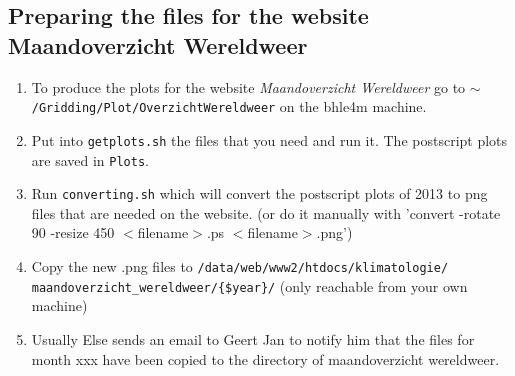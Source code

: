 \documentclass[a4paper]{article}
\begin{document}
\subsection{Preparing the files for the website Maandoverzicht
  Wereldweer}
\begin{enumerate}
\item To produce the plots for the website \textit{Maandoverzicht
    Wereldweer} go to
  \texttt{$\sim$/Gridding/Plot/OverzichtWereldweer} on the bhle4m
  machine.
\item Put into \texttt{getplots.sh} the files that you need and run
  it. The postscript plots are saved in \texttt{Plots}.
\item Run \texttt{converting.sh} which will convert the postscript
  plots of 2013 to png files that are needed on the website. (or do it
  manually with 'convert -rotate 90 -resize 450 $<$filename$>$.ps
  $<$filename$>$.png')
\item Copy the new .png files to
  \texttt{/data/web/www2/htdocs/klimatologie/\\maandoverzicht\_wereldweer/\{\$year\}/}
  (only reachable from your own machine)
\item Usually Else sends an email to Geert Jan to notify him that the
  files for month xxx have been copied to the directory of
  maandoverzicht wereldweer.
\end{enumerate}
\end{document}
